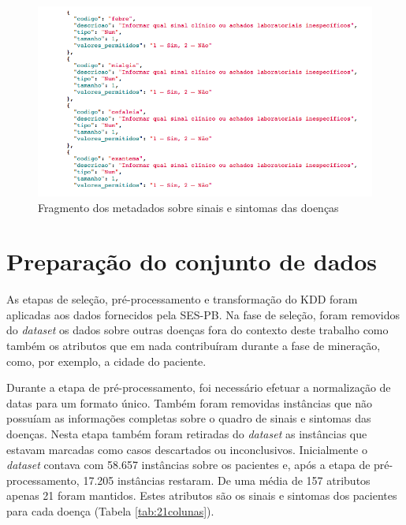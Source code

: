 \begin{figure}[htb]
  \caption{\label{fig:metadados}Fragmento dos metadados sobre sinais e sintomas das doenças}
  \begin{center}
    \includegraphics[width=\textwidth]{imagens/fragmentodosmetadados.png}
  \end{center}
\end{figure}
\newpage

\section{Preparação do conjunto de dados}

As etapas de seleção, pré-processamento e transformação do KDD foram aplicadas aos dados fornecidos pela SES-PB. Na fase de seleção, foram removidos do \textit{dataset} os dados sobre outras doenças fora do contexto deste trabalho como também os atributos que em nada contribuíram durante a fase de mineração, como, por exemplo, a cidade do paciente.

Durante a etapa de pré-processamento, foi necessário efetuar a normalização de datas para um formato único. Também foram removidas instâncias que não possuíam as informações completas sobre o quadro de sinais e sintomas das doenças. Nesta etapa também foram retiradas do \textit{dataset} as instâncias que estavam marcadas como casos descartados ou inconclusivos. Inicialmente o \textit{dataset} contava com 58.657 instâncias sobre os pacientes e, após a etapa de pré-processamento, 17.205 instâncias restaram. De uma média de 157 atributos apenas 21 foram mantidos. Estes atributos são os sinais e sintomas dos pacientes para cada doença (Tabela \ref{tab:21colunas}).

